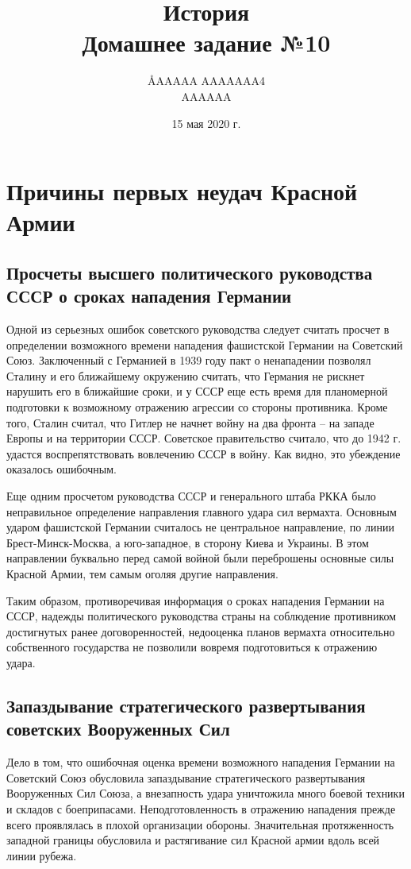 \documentclass[12pt]{article}
\title{История \\ Домашнее задание №10}
\author{\AA{AAAAA AAAAAAA}{4} \\ AAAAAA}
\date{15 мая 2020 г.}
\begin{document}
  \maketitle

  \setcounter{section}{1}
  \section{Причины первых неудач Красной Армии}
  \subsection{Просчеты высшего политического руководства СССР о сроках нападения Германии}
  Одной из серьезных ошибок советского руководства следует считать просчет
  в определении возможного времени нападения фашистской Германии на Советский Союз.
  Заключенный с Германией в 1939 году пакт о ненападении позволял Сталину и его ближайшему окружению считать,
  что Германия не рискнет нарушить его в ближайшие сроки,
  и у СССР еще есть время для планомерной подготовки к возможному отражению агрессии со стороны противника.
  Кроме того, Сталин считал, что Гитлер не начнет войну на два фронта -- на западе Европы и на территории СССР.
  Советское правительство считало, что до 1942 г. удастся воспрепятствовать вовлечению СССР в войну.
  Как видно, это убеждение оказалось ошибочным.

  Еще одним просчетом руководства СССР и генерального штаба РККА было неправильное определение направления главного удара сил вермахта.
  Основным ударом фашистской Германии считалось не центральное направление, по линии Брест-Минск-Москва,
  а юго-западное, в сторону Киева и Украины.
  В этом направлении буквально перед самой войной были переброшены основные силы Красной Армии, тем самым оголяя другие направления.

  Таким образом, противоречивая информация о сроках нападения Германии на СССР, надежды политического руководства страны на соблюдение противником достигнутых ранее договоренностей, недооценка планов вермахта относительно собственного государства не позволили вовремя подготовиться к отражению удара.

  \subsection{Запаздывание стратегического развертывания советских Вооруженных Сил}
  Дело в том, что ошибочная оценка времени возможного нападения Германии на Советский Союз обусловила запаздывание стратегического развертывания Вооруженных Сил Союза, а внезапность удара уничтожила много боевой техники и складов с боеприпасами.
  Неподготовленность в отражению нападения прежде всего проявлялась в плохой организации обороны.
  Значительная протяженность западной границы обусловила и растягивание сил Красной армии вдоль всей линии рубежа.
\end{document}
